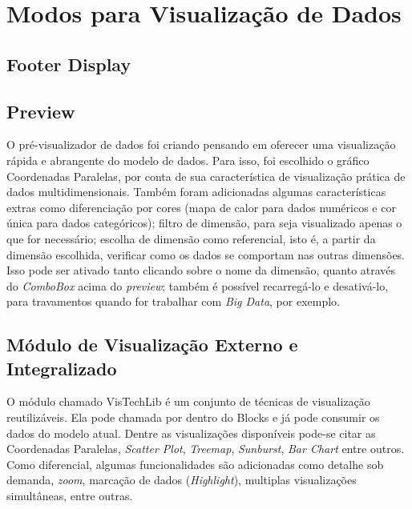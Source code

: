 \documentclass[
	12pt,				%
	openright,			%
	twoside,			%
	a4paper,			%
	english,			%
	brazil				%
	]{abntex2}
\begin{document}
	\section{Modos para Visualização de Dados}

		
		\subsection{Footer Display}

		\subsection{Preview}
			O pré-visualizador de dados foi criando pensando em oferecer uma visualização rápida e abrangente do modelo de dados.
			Para isso, foi escolhido o gráfico Coordenadas Paralelas, por conta de sua característica de visualização prática de dados multidimensionais.
			Também foram adicionadas algumas características extras como diferenciação por cores (mapa de calor para dados numéricos e cor única para dados categóricos); 
				filtro de dimensão, para seja visualizado apenas o que for necessário;
				escolha de dimensão como referencial, isto é, a partir da dimensão escolhida, verificar como os dados se comportam nas outras dimensões. Isso pode ser ativado tanto clicando sobre o nome da dimensão, quanto através do \emph{ComboBox} acima do \emph{preview};
				também é possível recarregá-lo e desativá-lo, para travamentos quando for trabalhar com \emph{Big Data}, por exemplo.

		\subsection{Módulo de Visualização Externo e Integralizado}
			O módulo chamado VisTechLib é um conjunto de técnicas de visualização reutilizáveis.
			Ela pode chamada por dentro do Blocks e já pode consumir os dados do modelo atual.
			Dentre as visualizações disponíveis pode-se citar as Coordenadas Paralelas, \emph{Scatter Plot}, \emph{Treemap}, \emph{Sunburst}, \emph{Bar Chart} entre outros.
			Como diferencial, algumas funcionalidades são adicionadas como detalhe sob demanda, \emph{zoom}, marcação de dados (\emph{Highlight}), multiplas visualizações simultâneas, entre outras.
	
\end{document}
